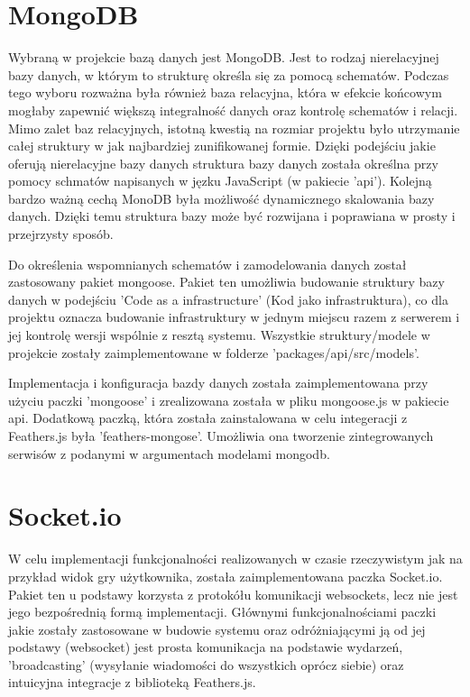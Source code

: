 \section{MongoDB}
Wybraną w projekcie bazą danych jest MongoDB. Jest to rodzaj nierelacyjnej bazy danych, w którym to strukturę określa się za pomocą schematów. Podczas tego wyboru rozważna była również baza relacyjna, która w efekcie końcowym mogłaby zapewnić większą integralność danych oraz kontrolę schematów i relacji. Mimo zalet baz relacyjnych, istotną kwestią na rozmiar projektu było utrzymanie całej struktury w jak najbardziej zunifikowanej formie. Dzięki podejściu jakie oferują nierelacyjne bazy danych struktura bazy danych została określna przy pomocy schmatów napisanych w jęzku JavaScript (w pakiecie 'api'). Kolejną bardzo ważną cechą MonoDB była możliwość dynamicznego skalowania bazy danych. Dzięki temu struktura bazy może być rozwijana i poprawiana w prosty i przejrzysty sposób.

Do określenia wspomnianych schematów i zamodelowania danych został zastosowany pakiet mongoose. Pakiet ten umożliwia budowanie struktury bazy danych w podejściu 'Code as a infrastructure' (Kod jako infrastruktura), co dla projektu oznacza budowanie infrastruktury w jednym miejscu razem z serwerem i jej kontrolę wersji wspólnie z resztą systemu. Wszystkie struktury/modele w projekcie zostały zaimplementowane w folderze 'packages/api/src/models'.

Implementacja i konfiguracja bazdy danych została zaimplementowana przy użyciu paczki 'mongoose' i zrealizowana została w pliku mongoose.js w pakiecie api. Dodatkową paczką, która została zainstalowana w celu integeracji z Feathers.js była 'feathers-mongose'. Umożliwia ona tworzenie zintegrowanych serwisów z podanymi w argumentach modelami mongodb.

\section{Socket.io}
W celu implementacji funkcjonalności realizowanych w czasie rzeczywistym jak na przykład widok gry użytkownika, została zaimplementowana paczka Socket.io. Pakiet ten u podstawy korzysta z protokółu komunikacji websockets, lecz nie jest jego bezpośrednią formą implementacji. Głównymi funkcjonalnościami paczki jakie zostały zastosowane w budowie systemu oraz odróżniającymi ją od jej podstawy (websocket) jest prosta komunikacja na podstawie wydarzeń, 'broadcasting' (wysyłanie wiadomości do wszystkich oprócz siebie) oraz intuicyjna integracje z biblioteką Feathers.js.

